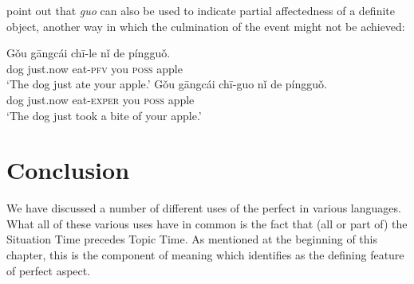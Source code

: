 \ea \label{ex:22.48}
\z \z


\citet[151]{HuangDavis1989} point out that \textit{guo} can also be used to indicate partial affectedness of a definite object, another way in which the culmination of the event might not be achieved:


\ea \label{ex:22.49}
\ea \gll  Gǒu  gāngcái chī-le  nǐ  de  píngguǒ.\\
dog  just.now  eat-\textsc{pfv}  you  \textsc{poss}  apple\\
\glt ‘The dog just ate your apple.’
\ex \gll  Gǒu  gāngcái chī-guo  nǐ  de  píngguǒ.\\
dog  just.now  eat-\textsc{exper}  you  \textsc{poss}  apple\\
\glt ‘The dog just took a bite of your apple.’ 
\z \z

\section{Conclusion}\label{sec:22.7}

We have discussed a number of different uses of the perfect in various languages. What all of these various uses have in common is the fact that (all or part of) the Situation Time precedes Topic Time. As mentioned at the beginning of this chapter, this is the component of meaning which \citet{Klein1992} identifies as the defining feature of perfect aspect.



